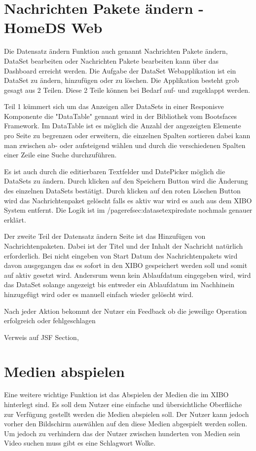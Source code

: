 \section{Nachrichten Pakete ändern - HomeDS Web}\label{sec:homedswebdataset}
Die Datensatz ändern Funktion auch genannt Nachrichten Pakete ändern, DataSet bearbeiten oder Nachrichten Pakete bearbeiten kann über das Dashboard erreicht werden.
Die Aufgabe der DataSet Webapplikation ist ein DataSet zu ändern, hinzufügen oder zu löschen. Die Applikation besteht grob gesagt aus 2 Teilen. Diese 2 Teile können bei Bedarf auf- und zugeklappt werden.

Teil 1 kümmert sich um das Anzeigen aller DataSets in einer Responisve Komponente die "DataTable" gennant wird in der Bibliothek vom Bootsfaces Framework. Im DataTable ist es möglich die Anzahl der angezeigten Elemente pro Seite zu begrenzen oder erweitern,  die einzelnen Spalten sortieren dabei kann man zwischen ab- oder aufsteigend wählen und durch die verschiedenen Spalten einer Zeile eine Suche durchzuführen. 

Es ist auch durch die editierbaren Textfelder und DatePicker möglich die DataSets zu ändern. Durch klicken auf den Speichern Button wird die Änderung des einzelnen DataSets bestätigt. Durch klicken auf den roten Löschen Button wird das Nachrichtenpaket gelöscht falls es aktiv war wird es auch aus dem XIBO System entfernt. Die Logik ist im /pageref{sec:datasetexpiredate} nochmals genauer erklärt. 

Der zweite Teil der Datensatz ändern Seite ist das Hinzufügen von Nachrichtenpaketen. Dabei ist der Titel und der Inhalt der Nachricht natürlich erforderlich. Bei nicht eingeben von Start Datum des Nachrichtenpakets wird davon ausgegangen das es sofort in den XIBO gespeichert werden soll und somit auf aktiv gesetzt wird. Andersrum wenn kein Ablaufdatum eingegeben wird, wird das DataSet solange angezeigt bis entweder ein Ablaufdatum im Nachhinein hinzugefügt wird oder es manuell einfach wieder gelöscht wird.

Nach jeder Aktion bekommt der Nutzer ein Feedback ob die jeweilige Operation erfolgreich oder fehlgeschlagen

Verweis auf JSF Section,


\section{Medien abspielen}\label{sec:playmedia}
Eine weitere wichtige Funktion ist das Abspielen der Medien die im XIBO hinterlegt sind. Es soll dem Nutzer eine einfache und übersichtliche Oberfläche zur Verfügung gestellt werden die Medien abspielen soll. Der Nutzer kann jedoch vorher den Bildschirm auswählen auf den diese Medien abgespielt werden sollen. Um jedoch zu verhindern das der Nutzer zwischen hunderten von Medien sein Video suchen muss gibt es eine Schlagwort Wolke.

